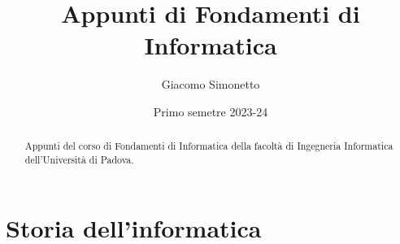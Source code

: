 \documentclass[a4paper]{article}
\title{Appunti di Fondamenti di Informatica}
\author{Giacomo Simonetto}
\date{Primo semetre 2023-24}
\begin{document}
\maketitle
\begin{abstract}
	Appunti del corso di Fondamenti di Informatica della facoltà di Ingegneria Informatica dell'Università di Padova.
\end{abstract}

\newpage

\tableofcontents

\newpage

\section{Storia dell'informatica}
\end{document}
